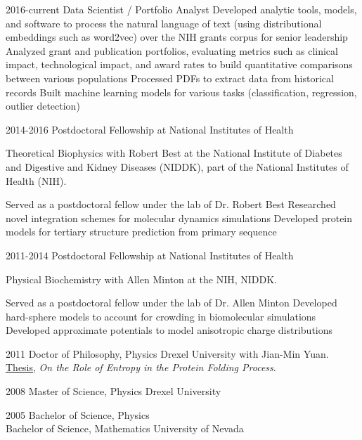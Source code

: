 \documentclass[]{scrartcl}
\begin{document}
\begin{cleanCV}


   \vspace{1.5em}


  \WorkExperience
{2016-current}
{Data Scientist / Portfolio Analyst}
{
  Developed analytic tools, models, and software to process the natural language of text (using distributional embeddings such as word2vec) over the NIH grants corpus for senior leadership
Analyzed grant and publication portfolios, evaluating metrics such as clinical impact, technological impact, and award rates to build quantitative comparisons between various populations
Processed PDFs to extract data from historical records
Built machine learning models for various tasks (classification, regression, outlier detection)
}

 
\WorkExperience
{2014-2016}
{Postdoctoral Fellowship at National Institutes of Health}
{
Theoretical Biophysics with Robert Best at the
National Institute of Diabetes and Digestive and Kidney Diseases (NIDDK), 
part of the National Institutes of Health (NIH).

Served as a postdoctoral fellow under the lab of Dr. Robert Best
Researched novel integration schemes for molecular dynamics simulations
Developed protein models for tertiary structure prediction from primary sequence
}

\WorkExperience
{2011-2014}
{Postdoctoral Fellowship at National Institutes of Health}
{
  Physical Biochemistry with Allen Minton at the NIH, NIDDK.

  Served as a postdoctoral fellow under the lab of Dr. Allen Minton
Developed hard-sphere models to account for crowding in biomolecular simulations
Developed approximate potentials to model anisotropic charge distributions
}




\WorkExperience
{2011}
{Doctor of Philosophy, Physics}
{
Drexel University with Jian-Min Yuan. 
\href{https://idea.library.drexel.edu/islandora/object/idea:3488}{Thesis},
\emph{On the Role of Entropy in the Protein Folding Process}.
}

\WorkExperience
{2008}
{Master of Science, Physics}
{Drexel University}

\WorkExperience
{2005}
{Bachelor of Science, Physics\\
Bachelor of Science, Mathematics}
{University of Nevada}

%
%


\end{cleanCV}
\end{document}
